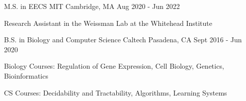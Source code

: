 

\begin{cventries}

  \cventry
    {M.S. in EECS} %
    {MIT} %
    {Cambridge, MA} %
    {Aug 2020 - Jun 2022} %
    {
      \begin{cvitems} %
        \item {Research Assistant in the Weissman Lab at the Whitehead Institute}
      \end{cvitems}
    }
  \cventry
    {B.S. in Biology and Computer Science} %
    {Caltech} %
    {Pasadena, CA} %
    {Sept 2016 - Jun 2020} %
    {
      \begin{cvitems} %
        \item {Biology Courses: Regulation of Gene Expression, Cell Biology, Genetics, Bioinformatics}
        \item {CS Courses: Decidability and Tractability, Algorithms, Learning Systems}
      \end{cvitems}
    }

\end{cventries}
